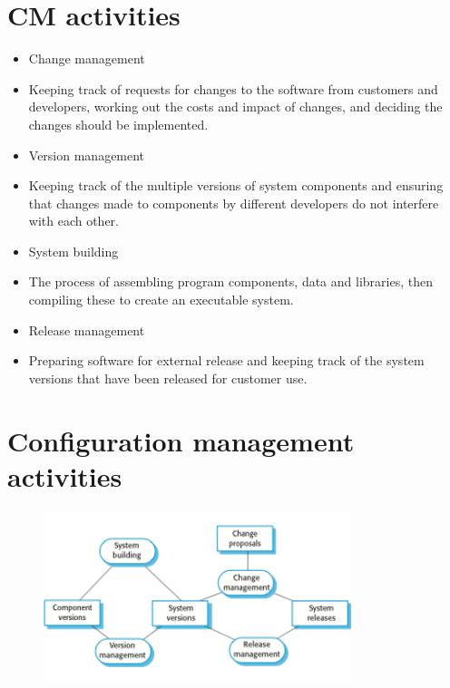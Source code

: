 \section{CM activities}
\begin{itemize}

\item Change management

   \item Keeping track of requests for changes to the software from customers and developers, working out the costs and impact of changes, and deciding the changes should be implemented.

\item Version management

   \item Keeping track of the multiple versions of system components and ensuring that changes made to components by different developers do not interfere with each other.

\item System building

   \item The process of assembling program components, data and libraries, then compiling these to create an executable system.

\item Release management

   \item Preparing software for external release and keeping track of the system versions that have been released for customer use.
\end{itemize}

\section{Configuration management activities}
\begin{figure}[h!]
    \centering
    \includegraphics[width = 0.8\textwidth]{./figures/L8_1.png}
    \caption{}
    \label{fig:L8_1}
\end{figure}

